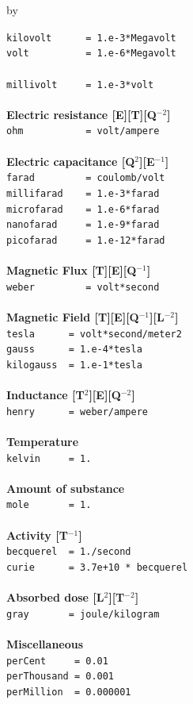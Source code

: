 \documentclass[twoside]{article}
\newcommand{\entrylabel}[1]{\mbox{\textbf{{#1}}}\hfil}%
\newenvironment{entry}
{\begin{list}{}%
    {\renewcommand{\makelabel}{\entrylabel}%
     \setlength{\labelwidth}{90pt}%
     \setlength{\leftmargin}{\labelwidth}
     \advance\leftmargin by \labelsep%
      }%
    }%
  {\end{list}}
\newcommand{\Entrylabel}[1]%
{\raisebox{0pt}[1ex][0pt]{\makebox[\labelwidth][l]%
    {\parbox[t]{\labelwidth}{\hspace{0pt}\textbf{{#1}}}}}}
\newenvironment{Entry}%
{\renewcommand{\entrylabel}{\Entrylabel}\begin{entry}}%
  {\end{entry}}
\begin{document}
\begin{description}
\begin{Entry}
  \verb+kilovolt      = 1.e-3*Megavolt+ \\
  \verb+volt          = 1.e-6*Megavolt+ \\ \\
  \verb+millivolt     = 1.e-3*volt+ \\ \\
{\bf Electric resistance [E][T][Q$^{-2}$]} \\
  \verb+ohm           = volt/ampere+ \\ \\
{\bf Electric capacitance [Q$^{2}$][E$^{-1}$]} \\
  \verb+farad         = coulomb/volt+ \\
  \verb+millifarad    = 1.e-3*farad+ \\
  \verb+microfarad    = 1.e-6*farad+ \\
  \verb+nanofarad     = 1.e-9*farad+ \\
  \verb+picofarad     = 1.e-12*farad+ \\ \\
{\bf Magnetic Flux [T][E][Q$^{-1}$]} \\
  \verb+weber         = volt*second+ \\ \\
{\bf Magnetic Field [T][E][Q$^{-1}$][L$^{-2}$]} \\
  \verb+tesla      = volt*second/meter2+ \\
  \verb+gauss      = 1.e-4*tesla+ \\
  \verb+kilogauss  = 1.e-1*tesla+ \\ \\
{\bf Inductance [T$^{2}$][E][Q$^{-2}$]} \\
  \verb+henry      = weber/ampere+ \\ \\
{\bf Temperature} \\
  \verb+kelvin     = 1.+ \\ \\
{\bf Amount of substance} \\
  \verb+mole       = 1.+ \\ \\
{\bf Activity [T$^{-1}$]} \\
  \verb+becquerel  = 1./second+ \\
  \verb$curie      = 3.7e+10 * becquerel$ \\ \\
{\bf Absorbed dose [L$^{2}$][T$^{-2}$]} \\
  \verb+gray       = joule/kilogram+ \\ \\
{\bf Miscellaneous} \\
  \verb+perCent     = 0.01+ \\
  \verb+perThousand = 0.001+ \\
  \verb+perMillion  = 0.000001+ \\


\end{Entry}
\end{description}
\end{document}
